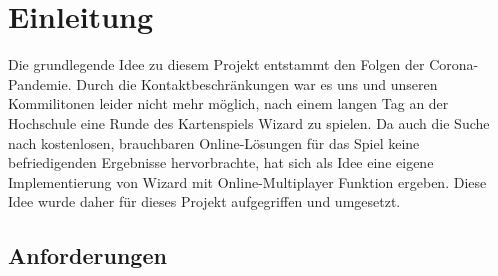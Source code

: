 \chapter{Einleitung}

Die grundlegende Idee zu diesem Projekt entstammt den Folgen der Corona-Pandemie. Durch die Kontaktbeschränkungen war es uns und unseren Kommilitonen leider nicht mehr möglich, nach einem langen Tag an der Hochschule eine Runde des Kartenspiels Wizard \cite{wizard} zu spielen. Da auch die Suche nach kostenlosen, brauchbaren Online-Lösungen für das Spiel keine befriedigenden Ergebnisse hervorbrachte, hat sich als Idee eine eigene Implementierung von Wizard mit Online-Multiplayer Funktion ergeben. Diese Idee wurde daher für dieses Projekt aufgegriffen und umgesetzt.

\section{Anforderungen}

